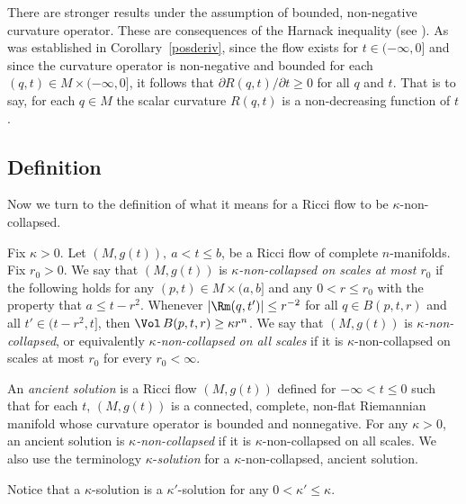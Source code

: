 There are  stronger results under the assumption of bounded, non-negative
curvature operator. These are consequences of the Harnack inequality (see
\cite{Hamiltonharnack}). As was established in Corollary~\ref{posderiv}, since
the flow exists for $t\in (-\infty,0]$ and since the curvature operator is
non-negative and bounded for each $(q,t)\in M\times (-\infty,0]$, it follows
that $\partial R(q,t)/\partial t\ge 0$ for all $q$ and $t$. That is to say, for
each $q\in M$ the scalar curvature $R(q,t)$  is a non-decreasing function of
$t$.

\subsection{Definition}

Now we turn to the definition of what it means for a Ricci flow to
be $\kappa$-non-collapsed.

\begin{definition}\label{def:kappa-noncollapsed}
\label{kappadefn}
Fix $\kappa>0$. Let $(M,g(t)),\ a<t\le b$, be a Ricci flow of
complete $n$-manifolds. Fix $r_0>0$. We say that $(M,g(t))$ is {\em
$\kappa$-non-collapsed on scales at
most $r_0$} if the following holds for any $(p,t)\in M\times (a,b]$
and any $0<r\le r_0$  with the property that $a\le t-r^2$. Whenever
$|\Rm(q,t')|\le r^{-2}$ for all $q\in B(p,t,r)$ and all $t'\in
(t-r^2,t]$, then $\Vol\,B(p,t,r)\ge \kappa r^n$. We say that
$(M,g(t))$ is {\em $\kappa$-non-collapsed}, or equivalently {\em
$\kappa$-non-collapsed on all scales} if it is
$\kappa$-non-collapsed on scales at most $r_0$ for every
$r_0<\infty$.
\end{definition}


\begin{definition}\label{def:ancient-solution}
An {\em ancient solution} is a Ricci flow
 $(M,g(t))$ defined for $-\infty <t \leq 0$ such
that for each $t$, $(M,g(t))$ is a connected, complete, non-flat
Riemannian manifold whose curvature operator is bounded and
nonnegative. For any $\kappa>0$, an ancient solution is {\sl
$\kappa$-non-collapsed} if it is $\kappa$-non-collapsed on all
scales. We also use the terminology $\kappa$-{\sl solution} for a
$\kappa$-non-collapsed, ancient solution.
\end{definition}

Notice that a $\kappa$-solution is a $\kappa'$-solution for any
$0<\kappa'\le \kappa$.



